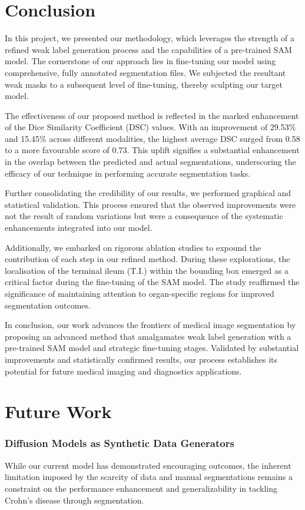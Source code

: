 \section{Conclusion}

In this project, we presented our methodology, which leverages the strength of a refined weak label generation process and the capabilities of a pre-trained SAM model. The cornerstone of our approach lies in fine-tuning our model using comprehensive, fully annotated segmentation files. We subjected the resultant weak masks to a subsequent level of fine-tuning, thereby sculpting our target model.

The effectiveness of our proposed method is reflected in the marked enhancement of the Dice Similarity Coefficient (DSC) values. With an improvement of 29.53\% and 15.45\% across different modalities, the highest average DSC surged from 0.58 to a more favourable score of 0.73. This uplift signifies a substantial enhancement in the overlap between the predicted and actual segmentations, underscoring the efficacy of our technique in performing accurate segmentation tasks.

Further consolidating the credibility of our results, we performed graphical and statistical validation. This process ensured that the observed improvements were not the result of random variations but were a consequence of the systematic enhancements integrated into our model.

Additionally, we embarked on rigorous ablation studies to expound the contribution of each step in our refined method. During these explorations, the localisation of the terminal ileum (T.I.) within the bounding box emerged as a critical factor during the fine-tuning of the SAM model. The study reaffirmed the significance of maintaining attention to organ-specific regions for improved segmentation outcomes.

In conclusion, our work advances the frontiers of medical image segmentation by proposing an advanced method that amalgamates weak label generation with a pre-trained SAM model and strategic fine-tuning stages. Validated by substantial improvements and statistically confirmed results, our process establishes its potential for future medical imaging and diagnostics applications.

\section{Future Work}

\subsubsection*{Diffusion Models as Synthetic Data Generators}
While our current model has demonstrated encouraging outcomes, the inherent limitation imposed by the scarcity of data and manual segmentations remains a constraint on the performance enhancement and generalizability in tackling Crohn's disease through segmentation.

